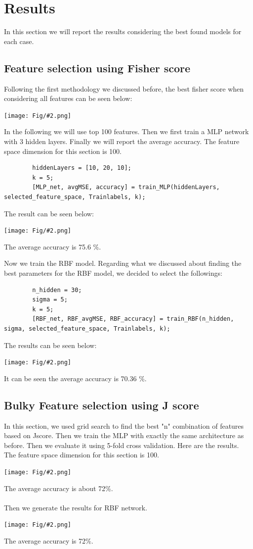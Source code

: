 \documentclass[]{article}
\newcommand{\pict}[2]{\begin{center}
		\texttt{[image: Fig/\#2.png]}
\end{center}}
\begin{document}
	\section{Results}
	In this section we will report the results considering the best found models for each case.
	\subsection{Feature selection using Fisher score}
	Following the first methodology we discussed before, the best fisher score when considering all features can be seen below:
	\pict{1}{F5}
	In the following we will use top 100 features. Then we first train a MLP network with 3 hidden layers. Finally we will report the average accuracy. The feature space dimension for this section is 100.
	\begin{lstlisting}
		hiddenLayers = [10, 20, 10];
		k = 5;
		[MLP_net, avgMSE, accuracy] = train_MLP(hiddenLayers, selected_feature_space, Trainlabels, k);
	\end{lstlisting}
	The result can be seen below:
	\pict{0.6}{F6}
	The average accuracy is 75.6 \%.
	
	Now we train the RBF model. Regarding what we discussed about finding the best parameters for the RBF model, we decided to select the followings:
	\begin{lstlisting}
		n_hidden = 30;
		sigma = 5;
		k = 5;
		[RBF_net, RBF_avgMSE, RBF_accuracy] = train_RBF(n_hidden, sigma, selected_feature_space, Trainlabels, k);
	\end{lstlisting}
	The results can be seen below:
	\pict{0.6}{F7}
	It can be seen the average accuracy is 70.36 \%.
	
	\subsection{Bulky Feature selection using J score}
	In this section, we used grid search to find the best "n" combination of features based on Jscore. Then we train the MLP with exactly the same architecture as before. Then we evaluate it using 5-fold cross validation. Here are the results. The feature space dimension for this section is 100.
	\pict{0.6}{F8}
	The average accuracy is about 72\%.\\\\
	Then we generate the results for RBF network.
	\pict{0.6}{F9}
	The average accuracy is 72\%.
	
\end{document}
